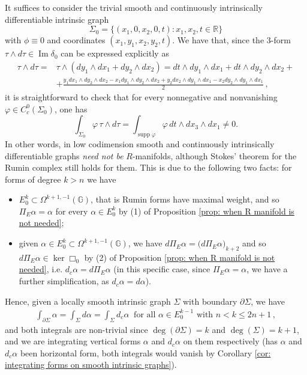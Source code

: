 \documentclass[dvipsnames]{amsart}
\theoremstyle{definition}
\theoremstyle{definition}
\numberwithin{equation}{section}
\newcommand{\R}{\mathbb{R}}
\newcommand{\G}{\mathbb{G}}
\begin{document}
    It suffices to consider the trivial smooth and continuously intrinsically differentiable intrinsic graph
    \[
    \Sigma_0=\{(x_1,0,x_2,0,t):x_1,x_2,t\in\R\}
    \]
    with $\phi\equiv0$ and coordinates $(x_1,y_1,x_2,y_2,t)$.
    We have that, since the 3-form $\tau\wedge d\tau\in\operatorname{Im}\delta_0$ can be expressed explicitly as
    \begin{align*}
    \tau\wedge d\tau=&\tau\wedge (dy_1\wedge dx_1+dy_2\wedge dx_2)=dt\wedge dy_1\wedge dx_1+dt\wedge dy_2\wedge dx_2+\\&+\frac{y_1 dx_1\wedge dy_2\wedge dx_2 -x_1 dy_1\wedge dy_2\wedge dx_2+y_2 dx_2\wedge dy_1\wedge dx_1-x_2 dy_2\wedge dy_1\wedge dx_1}{2}\,, 
    \end{align*}it is straightforward to check that for every nonnegative and nonvanishing $\varphi\in C_c^0(\Sigma_0)$, one has
    \[
    \int_{\Sigma_0} \varphi\, \tau\wedge d\tau=\int_{\operatorname{supp}\varphi} \varphi\,dt\wedge dx_3\wedge dx_1\neq0.
    \]
    In other words, in low codimension smooth and continuously intrinsically differentiable graphs \textit{need not be} $R$-manifolds, although Stokes' theorem for the Rumin complex still holds for them. This is due to the following two facts: for forms of degree $k>n$ we have
    \begin{itemize}
        \item $E_0^k\subset\Omega^{k+1,-1}(\G)$, that is Rumin forms have maximal weight, and so $\Pi_E\alpha=\alpha$ for every $\alpha\in E_0^k$ by (1) of Proposition \ref{prop: when R manifold is not needed};
        \item given $\alpha\in E_0^k\subset\Omega^{k+1,-1}(\G)$, we have $d\Pi_E\alpha =\big(d\Pi_E\alpha\big)_{k+2}$ and so $d\Pi_E\alpha\in\ker\Box_0$ by (2) of Proposition \ref{prop: when R manifold is not needed}, i.e. $d_c\alpha=d\Pi_E\alpha$ (in this specific case, since $\Pi_E\alpha=\alpha$, we have a further simplification, as $d_c\alpha=d\alpha$).
    \end{itemize}
    Hence, given a locally smooth intrinsic graph $\Sigma$ with boundary $\partial\Sigma$, we have
    \begin{align*}
        \int_{\partial\Sigma}\alpha=\int_{\Sigma}d\alpha=\int_\Sigma d_c\alpha\ \text{ for all }\alpha\in E_0^{k-1}\text{ with }n<k\le 2n+1\,,
    \end{align*}
    and both integrals are non-trivial since $\operatorname{deg}(\partial\Sigma)=k$ and $\operatorname{deg}(\Sigma)=k+1$, and we are integrating vertical forms $\alpha$ and $d_c\alpha$ on them respectively (has $\alpha$ and $d_c\alpha$ been horizontal form, both integrals would vanish by Corollary \ref{cor: integrating forms on smooth intrinsic graphs}).
\end{document}
